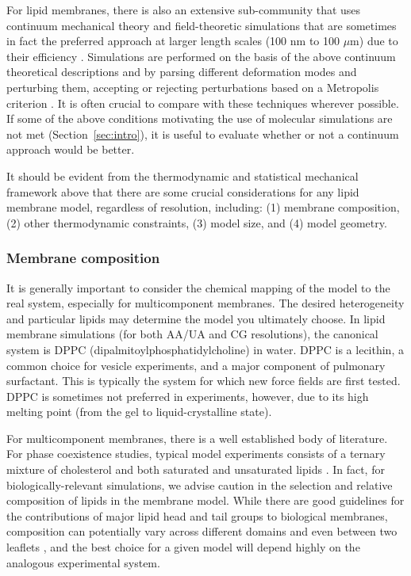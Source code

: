 \documentclass[9pt,bestpractices]{livecoms}
\begin{document}
For lipid membranes, there is also an extensive sub-community that uses continuum mechanical theory and field-theoretic simulations that are sometimes in fact the preferred approach at larger length scales (100 nm to 100 $\mu$m) due to their efficiency \cite{Smirnova2015,Brown2008,Sapp2014}.
Simulations are performed on the basis of the above continuum theoretical descriptions and by parsing different deformation modes and perturbing them, accepting or rejecting perturbations based on a Metropolis criterion \cite{Brannigan2006d}.
It is often crucial to compare with these techniques wherever possible.
If some of the above conditions motivating the use of molecular simulations are not met (Section~\ref{sec:intro}), it is useful to evaluate whether or not a continuum approach would be better.

It should be evident from the thermodynamic and statistical mechanical framework above that there are some crucial considerations for any lipid membrane model, regardless of resolution, including: (1) membrane composition, (2) other thermodynamic constraints, (3) model size, and (4) model geometry.

\subsubsection{Membrane composition}
\label{subsubsec:composition}
It is generally important to consider the chemical mapping of the model to the real system, especially for multicomponent membranes.
The desired heterogeneity and particular lipids may determine the model you ultimately choose.
In lipid membrane simulations (for both AA/UA and CG resolutions), the canonical system is DPPC (dipalmitoylphosphatidylcholine) in water.
DPPC is a lecithin, a common choice for vesicle experiments, and a major component of pulmonary surfactant.
This is typically the system for which new force fields are first tested.
DPPC is sometimes not preferred in experiments, however, due to its high melting point (from the gel to liquid-crystalline state).

For multicomponent membranes, there is a well established body of literature.
For phase coexistence studies, typical model experiments consists of a ternary mixture of cholesterol and both saturated and unsaturated lipids \cite{Berkowitz2009}.
In fact, for biologically-relevant simulations, we advise caution in the selection and relative composition of lipids in the membrane model.
While there are good guidelines for the contributions of major lipid head and tail groups to biological membranes, composition can potentially vary across different domains and even between two leaflets \cite{Ing??lfsson2014}, and the best choice for a given model will depend highly on the analogous experimental system.
\end{document}
